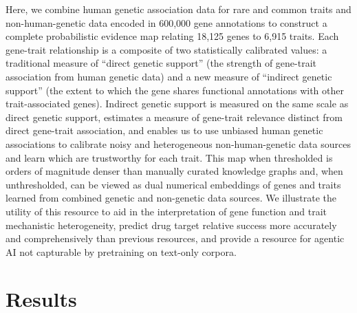 \documentclass[sn-nature,lineno]{sn-jnl}%
\theoremstyle{thmstyleone}%
\theoremstyle{thmstyletwo}%
\theoremstyle{thmstylethree}%
\begin{document}
Here, we combine human genetic association data for rare and common traits and non-human-genetic data encoded in 600,000 gene annotations to construct a complete probabilistic evidence map relating 18,125 genes to 6,915 traits. Each gene-trait relationship is a composite of two statistically calibrated values: a traditional measure of  ``direct genetic support'' (the strength of gene-trait association from human genetic data) and a new  measure of ``indirect genetic support'' (the extent to which the gene shares functional annotations with other trait-associated genes). Indirect genetic support is measured on the same scale as direct genetic support, estimates a measure of gene-trait relevance distinct from direct gene-trait association, and enables us to use unbiased human genetic associations to calibrate noisy and heterogeneous non-human-genetic data sources and learn which are trustworthy for each trait. This map when thresholded is orders of magnitude denser than manually curated knowledge graphs and, when unthresholded, can be viewed as dual numerical embeddings of genes and traits learned from combined genetic and non-genetic data sources. We illustrate the utility of this resource to aid in the interpretation of gene function and trait mechanistic heterogeneity, predict drug target relative success more accurately and comprehensively than previous resources, and provide a resource for agentic AI not capturable by pretraining on text-only corpora.



\section{Results}
\end{document}
